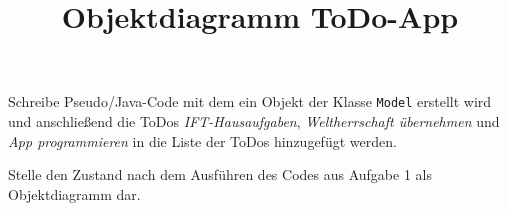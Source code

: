 \documentclass[a4paper,DIV =14]{scrartcl}
\date{}
\title{Objektdiagramm ToDo-App}
\begin{document}
\begin{aufgabe}
Schreibe Pseudo/Java-Code mit dem ein Objekt der Klasse \texttt{Model} erstellt wird und anschließend die ToDos \emph{IFT-Hausaufgaben}, \emph{Weltherrschaft übernehmen} und \emph{App programmieren} in die Liste der ToDos hinzugefügt werden.
\end{aufgabe}

\begin{aufgabe}
Stelle den Zustand nach dem Ausführen des Codes aus Aufgabe 1 als Objektdiagramm dar.
\end{aufgabe}
\end{document}
